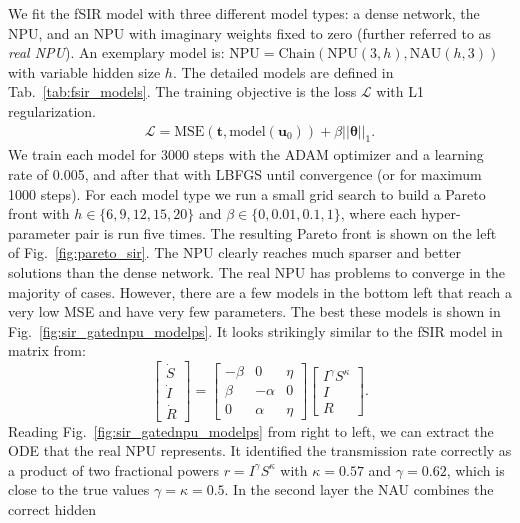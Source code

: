 \documentclass[9pt]{article}
\newcommand{\npu}{\text{NPU}}
\newcommand{\nau}{\text{NAU}}
\newcommand{\chain}{\text{Chain}}
\renewcommand{\arraystretch}{1.2}
\begin{document}
We fit the fSIR model with three different model types: a dense network, the
NPU, and an NPU with imaginary weights fixed to zero (further referred to as
\emph{real NPU}). An exemplary model is: $\npu=\chain(\npu(3,h),\nau(h,3))$
with variable hidden size $h$.  The detailed models are defined in
Tab.~\ref{tab:fsir_models}. The training objective is the loss $\mathcal{L}$
with L1 regularization.
\begin{align}
  \label{eq:sir_loss}
  \mathcal{L} = \text{MSE}(\bm t,\text{model}(\bm u_0)) + \beta||\bm\theta||_1.
\end{align}
We train each model for 3000 steps with the ADAM optimizer and a learning rate
of 0.005, and after that with LBFGS until convergence (or for maximum 1000
steps).  For each model type we run a small grid search to build a Pareto front
with $h\in \{6,9,12,15,20\}$ and $\beta\in\{0,0.01,0.1,1\}$, where each
hyper-parameter pair is run five times. The resulting Pareto front is shown on
the left of Fig.~\ref{fig:pareto_sir}. The NPU clearly reaches much sparser and
better solutions than the dense network.
The real NPU has problems to converge in the majority of cases.
However, there are a few models in the bottom left that
reach a very low MSE and have very few parameters. The best these models is
shown in Fig.~\ref{fig:sir_gatednpu_modelps}.  It looks strikingly similar to
the fSIR model in matrix from:
\renewcommand*{\arraystretch}{1.3}
\begin{equation}
  \begin{bmatrix}
    \dot S \\ \dot I \\ \dot R
  \end{bmatrix}
  =
  \begin{bmatrix}
    -\beta & 0 & \eta \\
    \beta & -\alpha & 0 \\
    0 & \alpha & \eta
  \end{bmatrix}
  \begin{bmatrix}
    I^\gamma S^\kappa \\ I \\ R
  \end{bmatrix}.
\end{equation}
Reading Fig.~\ref{fig:sir_gatednpu_modelps} from right to left, we can extract
the ODE that the real NPU represents.  It identified the transmission rate
correctly as a product of two fractional powers $r = I^\gamma S^\kappa$ with
$\kappa=0.57$ and $\gamma=0.62$, which is close to the true values
$\gamma=\kappa=0.5$.  In the second layer the NAU combines the correct hidden
\end{document}
